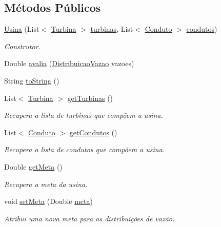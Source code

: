 \subsection*{Métodos Públicos}
\begin{DoxyCompactItemize}
\item 
\hyperlink{classusina_1_1_usina_a1ce70ad3a7a72cc11292ba73c98939bc}{Usina} (List$<$ \hyperlink{classusina_1_1_turbina}{Turbina} $>$ \hyperlink{classusina_1_1_usina_a5c258abf1e1c8a47c01a25711315352a}{turbinas}, List$<$ \hyperlink{classusina_1_1tubulacao_1_1_conduto}{Conduto} $>$ \hyperlink{classusina_1_1_usina_a417d6a65f366efc44a3c40bb0c64a7e0}{condutos})
\begin{DoxyCompactList}\small\item\em Construtor. \end{DoxyCompactList}\item 
Double \hyperlink{classusina_1_1_usina_ac2d787f27a524fa3d13164fe9124ad06}{avalia} (\hyperlink{classusina_1_1_distribuicao_vazao}{Distribuicao\-Vazao} vazoes)
\item 
String \hyperlink{classusina_1_1_usina_aa4d0029a0aa4e29a51598237d66178f3}{to\-String} ()
\item 
List$<$ \hyperlink{classusina_1_1_turbina}{Turbina} $>$ \hyperlink{classusina_1_1_usina_a2e456a6c00efcd5c9251f428e55f9a66}{get\-Turbinas} ()
\begin{DoxyCompactList}\small\item\em Recupera a lista de turbinas que compõem a usina. \end{DoxyCompactList}\item 
List$<$ \hyperlink{classusina_1_1tubulacao_1_1_conduto}{Conduto} $>$ \hyperlink{classusina_1_1_usina_ae6bb9fe84f617e90aebc64789125903f}{get\-Condutos} ()
\begin{DoxyCompactList}\small\item\em Recupera a lista de condutos que compõem a usina. \end{DoxyCompactList}\item 
Double \hyperlink{classusina_1_1_usina_a5c0a5be34924347400f3cf94ab4b7f0f}{get\-Meta} ()
\begin{DoxyCompactList}\small\item\em Recupera a meta da usina. \end{DoxyCompactList}\item 
void \hyperlink{classusina_1_1_usina_a8736dc1cbd2a8d5ed7e352dd9d4b5a90}{set\-Meta} (Double \hyperlink{classusina_1_1_usina_a43a57f61ea40c415edd72a9dc8ae997c}{meta})
\begin{DoxyCompactList}\small\item\em Atribui uma nova meta para as distribuições de vazão. \end{DoxyCompactList}\end{DoxyCompactItemize}
